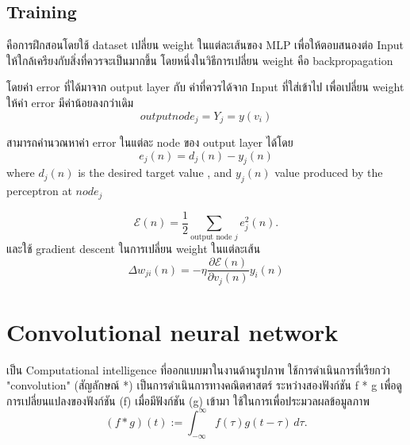 \subsection{Training}
คือการฝึกสอนโดยใช้ dataset เปลี่ยน weight ในแต่ละเส้นของ MLP เพื่อให้ตอบสนองต่อ Input ให้ใกล้เครียงกับสิ่งที่ควรจะเป็นมากขึ้น 
โดยหนึ่งในวิธีการเปลี่ยน weight คือ backpropagation
 

โดยค่า error ที่ได้มาจาก output layer กับ ค่าที่ควรได้จาก Input ที่ใส่เข้าไป เพื่อเปลี่ยน weight ให้ค่า error มีค่าน้อยลงกว่าเดิม
\begin{equation} output node_j =  Y_j =  y(v_i)  \end{equation}

 สามารถคำนวณหาค่า error ในแต่ละ node ของ output layer ได้โดย
 \begin{equation}  e_j(n)=d_j(n)-y_j(n) 
 \end{equation}
 where $d_{j}(n)$  is the desired target value , and $y_{j}(n)$   value produced by the perceptron at $node_j$


 
\begin{equation} 
{\displaystyle {\mathcal {E}}(n)={\frac {1}{2}}\sum _{{\text{output node }}j}e_{j}^{2}(n)}.
\end{equation} 
และใช้  gradient descent ในการเปลี่ยน weight ในแต่ละเส้น
\begin{equation} 
\Delta w_{ji} (n) = -\eta\frac{\partial\mathcal{E}(n)}{\partial v_j(n)} y_i(n)
\end{equation} 


 
 
\section{Convolutional neural network}
เป็น Computational intelligence ที่ออกแบบมาในงานด้านรูปภาพ 
ใช้การดำเนินการที่เรียกว่า "convolution"  (สัญลักษณ์ *) เป็นการดำเนินการทางคณิตศาสตร์ ระหว่างสองฟังก์ชัน f * g เพื่อดูการเปลี่ยนแปลงของฟังก์ชัน (f) เมื่อมีฟังก์ชัน (g) เข้ามา 
ใช้ในการเพื่อประมวลผลข้อมูลภาพ  
\begin{equation}
   {\displaystyle (f*g)(t):=\int _{-\infty }^{\infty }f(\tau )g(t-\tau )\,d\tau .}
\end{equation} 
 
